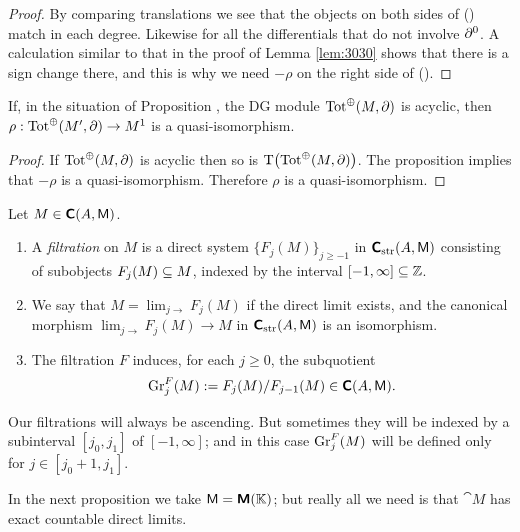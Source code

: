 \begin{proof}
By comparing translations we see that the objects on both sides of (\dag) match 
in each degree. Likewise for all the differentials that do not involve 
$\partial^0$. A calculation similar to that in the proof of Lemma 
\ref{lem:3030} shows that there is a sign change there, and this is why we need 
$-\rho$ on the right side of (\dag). 
\end{proof}

\begin{cor} \label{cor:3310}
If, in the situation of Proposition \tup{\ref{prop:3305}}, the DG module  
$\operatorname{Tot}^{\oplus}(M, \partial)$ is acyclic, then 
$\rho : \operatorname{Tot}^{\oplus}(M', \partial) \to M^1$ 
is a quasi-isomorphism. 
\end{cor}

\begin{proof}
If $\operatorname{Tot}^{\oplus}(M, \partial)$ is acyclic then so is 
$\operatorname{T} \bigl( \operatorname{Tot}^{\oplus}(M, \partial) \bigr)$. 
The proposition implies that $-\rho$ is a quasi-isomorphism. Therefore $\rho$ 
is a quasi-isomorphism. 
\end{proof}

\begin{dfn} \label{dfn:3335}
Let $M \in \boldsymbol{\mathsf{C}}(A, \operatorname{\mathsf{M}})$.
\begin{enumerate}
\item A {\em filtration}%
on $M$ is a direct system
$\{ F_j(M) \}_{j \geq -1}$ in $\boldsymbol{\mathsf{C}}_{\mathrm{str}}(A, \operatorname{\mathsf{M}})$
consisting of subobjects $F_j(M) \subseteq M$, indexed by the interval 
$[-1, \infty] \subseteq \mathbb{Z}$. 

\item We say that $M = \lim_{j \to} F_j(M)$
if the direct limit exists, and the 
canonical morphism $\lim_{j \to} F_j(M) \to M$ in 
$\boldsymbol{\mathsf{C}}_{\mathrm{str}}(A, \operatorname{\mathsf{M}})$ is an isomorphism. 

\item The filtration $F$ induces, for each $j \geq 0$, the subquotient 
\[ \operatorname{Gr}^F_j(M) := F_{j}(M) / F_{j - 1}(M) \in \boldsymbol{\mathsf{C}}(A, \operatorname{\mathsf{M}}) . \] 
\end{enumerate}
\end{dfn}

Our filtrations will always be ascending. But sometimes they will be indexed 
by a subinterval $[j_0, j_1]$ of $[-1, \infty]$; and in this case 
$\operatorname{Gr}^F_j(M)$ will be defined only for 
$j \in [j_0 + 1, j_1]$.
 
In the next proposition we take $\operatorname{\mathsf{M}} = \boldsymbol{\mathsf{M}}(\mathbb{K})$; but really 
all we need is that $\cat{M}$ has exact countable direct limits. 

